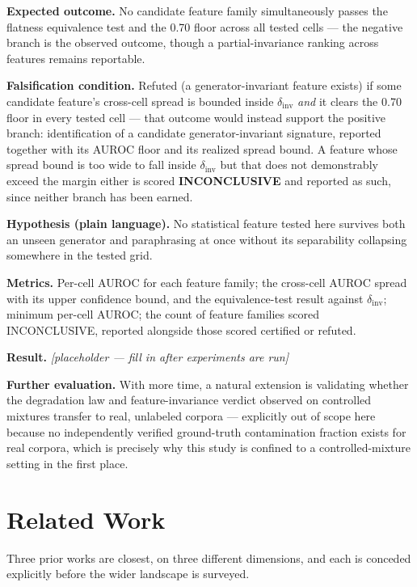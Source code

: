 \documentclass[11pt]{article}
\newcommand{\ph}{\textit{[placeholder --- fill in after experiments are run]}}
\begin{document}
\textbf{Expected outcome.} No candidate feature family simultaneously passes the flatness equivalence test and the 0.70 floor across all tested cells --- the negative branch is the observed outcome, though a partial-invariance ranking across features remains reportable.

\textbf{Falsification condition.} Refuted (a generator-invariant feature exists) if some candidate feature's cross-cell spread is bounded inside $\delta_{\text{inv}}$ \emph{and} it clears the 0.70 floor in every tested cell --- that outcome would instead support the positive branch: identification of a candidate generator-invariant signature, reported together with its AUROC floor and its realized spread bound. A feature whose spread bound is too wide to fall inside $\delta_{\text{inv}}$ but that does not demonstrably exceed the margin either is scored \textbf{INCONCLUSIVE} and reported as such, since neither branch has been earned.

\textbf{Hypothesis (plain language).} No statistical feature tested here survives both an unseen generator and paraphrasing at once without its separability collapsing somewhere in the tested grid.

\textbf{Metrics.} Per-cell AUROC for each feature family; the cross-cell AUROC spread with its upper confidence bound, and the equivalence-test result against $\delta_{\text{inv}}$; minimum per-cell AUROC; the count of feature families scored INCONCLUSIVE, reported alongside those scored certified or refuted.

\textbf{Result.} \ph

\vspace{0.5em}
\noindent\textbf{Further evaluation.} With more time, a natural extension is validating whether the degradation law and feature-invariance verdict observed on controlled mixtures transfer to real, unlabeled corpora --- explicitly out of scope here because no independently verified ground-truth contamination fraction exists for real corpora, which is precisely why this study is confined to a controlled-mixture setting in the first place.

\section{Related Work}

Three prior works are closest, on three different dimensions, and each is conceded explicitly before the wider landscape is surveyed.
\end{document}
